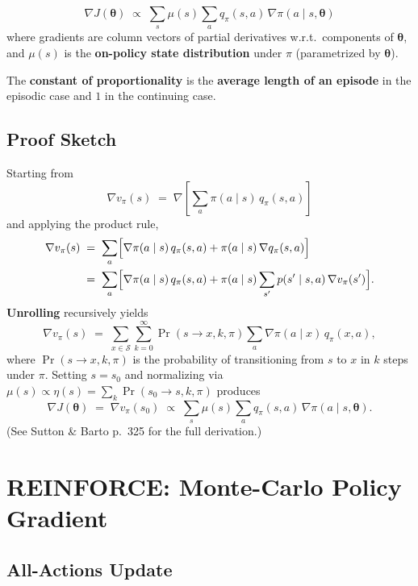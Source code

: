 \documentclass[11pt,a4paper]{article}
\theoremstyle{definition}
\theoremstyle{plain}
\theoremstyle{remark}
\begin{document}
\begin{tcolorbox}[colback=red!5!white, colframe=red!70!black, title={Policy Gradient Theorem (episodic case)}]
\[
    \nabla J(\boldsymbol{\theta}) \;\propto\; \sum_s \mu(s) \sum_a q_\pi(s, a)\, \nabla \pi(a \mid s, \boldsymbol{\theta})
\]
where gradients are column vectors of partial derivatives w.r.t.\ components of $\boldsymbol{\theta}$, and $\mu(s)$ is the \textbf{on-policy state distribution} under $\pi$ (parametrized by $\boldsymbol{\theta}$).
\end{tcolorbox}

The \textbf{constant of proportionality} is the \textbf{average length of an episode} in the episodic case and \textbf{$1$} in the continuing case.

\subsection{Proof Sketch}

Starting from
\[
    \nabla v_\pi(s) \;=\; \nabla\!\left[\sum_a \pi(a \mid s)\, q_\pi(s, a)\right]
\]
and applying the product rule,
\begin{align*}
    \nabla v_\pi(s) \;&=\; \sum_a \Bigl[\nabla \pi(a \mid s)\, q_\pi(s, a) + \pi(a \mid s)\, \nabla q_\pi(s, a)\Bigr] \\
                     &=\; \sum_a \Bigl[\nabla \pi(a \mid s)\, q_\pi(s, a) + \pi(a \mid s) \sum_{s'} p(s' \mid s, a)\, \nabla v_\pi(s')\Bigr].
\end{align*}
\textbf{Unrolling} recursively yields
\[
    \nabla v_\pi(s) \;=\; \sum_{x \in \mathcal{S}} \sum_{k=0}^{\infty} \Pr(s \to x, k, \pi) \sum_a \nabla \pi(a \mid x)\, q_\pi(x, a),
\]
where $\Pr(s \to x, k, \pi)$ is the probability of transitioning from $s$ to $x$ in $k$ steps under $\pi$. Setting $s = s_0$ and normalizing via $\mu(s) \propto \eta(s) = \sum_k \Pr(s_0 \to s, k, \pi)$ produces
\[
    \nabla J(\boldsymbol{\theta}) \;=\; \nabla v_\pi(s_0) \;\propto\; \sum_s \mu(s) \sum_a q_\pi(s, a)\, \nabla \pi(a \mid s, \boldsymbol{\theta}). \tag*{$\square$}
\]
(See Sutton \& Barto p.\ 325 for the full derivation.)

\section{REINFORCE: Monte-Carlo Policy Gradient}

\subsection{All-Actions Update}
\end{document}
